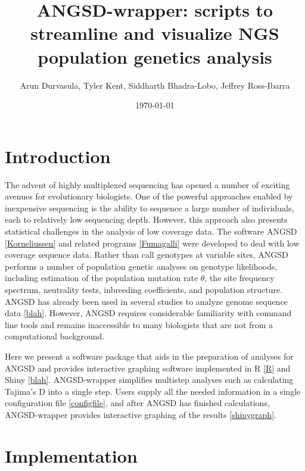 \documentclass[final]{beamer}
\title
[BAPG, 6 December 2014, Davis, CA, USA] %
{ %
ANGSD-wrapper: scripts to streamline and visualize NGS population genetics analysis
}
\author{ %
Arun Durvasula\inst{1}, Tyler Kent\inst{1}, Siddharth Bhadra-Lobo\inst{1}, Jeffrey Ross-Ibarra\inst{2}
}
\institute
[University of California, Davis] %
{
\inst{1} Dept. of Plant Sciences, University of California Davis\\[0.3ex]
\inst{2} Dept. of Plant Sciences, Center for Population Biology, and Genome Center, University of California Davis\\[0.3ex]
}
\date{\today}
\begin{document}
\begin{frame}[t]
\begin{multicols}{3}

\section{Introduction}

The advent of highly multiplexed sequencing has opened a number of exciting avenues for evolutionary biologists. 
One of the powerful approaches enabled by inexpensive sequencing is the ability to sequence a large number of individuals, each to relatively low sequencing depth. 
However, this approach also presents statistical challenges in the analysis of low coverage data.  
The software ANGSD \ref{Korneliussen} and related programs \ref{Fumagalli} were developed to deal with low coverage sequence data. %
Rather than call genotypes at variable sites, ANGSD performs a number of population genetic analyses on genotype likelihoods, including estimation of the population mutation rate $\theta$, the site frequency spectrum, neutrality tests, inbreeding coefficients, and population structure.
ANGSD has already been used in several studies to analyze genome sequence data \ref{blah}. %
However, ANGSD requires considerable familiarity with command line tools and remains inaccessible to many biologists that are not from a computational background. 

Here we present a software package that aids in the preparation of analyses for ANGSD and provides interactive graphing software implemented in R \ref{R} and Shiny \ref{blah}.  %
ANGSD-wrapper simplifies multistep analyses such as calculating Tajima’s D into a single step.
Users supply all the needed information in a single configuration file \ref{configfile}, and after ANGSD has finished calculations, ANGSD-wrapper provides interactive graphing of the results \ref{shinygraph}.

\section{Implementation}


\end{multicols}
\end{frame}
\end{document}
